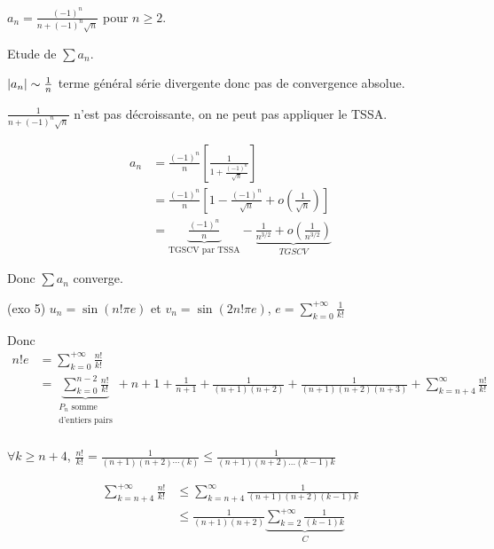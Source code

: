 \begin{exemple}
    $\displaystyle a_n = \frac{(-1)^n}{n + (-1)^n\sqrt{n}}$ pour $n \geqslant 2$. 

    Etude de $\sum a_n$.

    $\left|a_n\right| \sim \frac 1 n $ terme général série divergente donc pas de convergence absolue. 

    $\displaystyle \frac 1 {n + (-1)^n \sqrt n}$ n'est pas décroissante, on ne peut pas appliquer le TSSA. 

    \begin{align*}
        a_n & = \frac{(-1)^n} n \left[ \frac 1 {1 + \frac{(-1)^n} {\sqrt n}} \right] \\
            & = \frac{(-1)^n} n \left[ 1 - \frac{(-1)^n}{\sqrt n} + o\left( \frac 1 {\sqrt n} \right) \right] \\
            & = \underbrace{\frac{(-1)^n} n}_{\text{TGSCV par TSSA}} - \underbrace{\frac 1 {n^{3/2}} + o\left( \frac 1 {n^{3/2}} \right)}_{TGSCV}
    \end{align*}
    
    Donc $\sum a_n$ converge.

    \lvspace (exo 5) $u_n = \sin(n! \pi e)$ et $v_n = \sin(2 n! \pi e)$, $\displaystyle e = \sum_{k = 0 }^{ + \infty } \frac{1}{k!}$

    Donc \begin{align*}
        n! e & = \sum_{k = 0 }^{+ \infty } \frac{n!}{k!} \\
              & = \underbrace{\sum_{k = 0}^{n - 2} \frac{n!}{k!}}_{\substack{P_n \text{ somme} \\ \text{d'entiers pairs}}} + n + 1 + \frac{1}{n + 1} + \frac{1}{(n + 1)(n + 2)} + \frac 1 {(n + 1)(n + 2)(n + 3)} + \sum_{k = n + 4 }^{\infty } \frac{n! }{k!} \\
    \end{align*}

    $\displaystyle \forall k \geqslant n + 4$, $\displaystyle \frac{n!}{k!} = \frac{1}{(n + 1)(n + 2) \cdots (k)} \leqslant \frac{1}{(n + 1)(n + 2)\ldots(k - 1)k}$

    \begin{align*}
        \sum_{k = n + 4 }^{+ \infty } \frac{n! }{k!} & \leqslant \sum_{k = n + 4 }^{\infty    }\frac 1 {(n + 1)(n + 2) (k-1)k} \\
                                                    & \leqslant \frac 1 {(n + 1)(n + 2)} \underbrace{\sum_{k = 2 }^{+ \infty } \frac 1 {(k - 1)k}}_C \\
    \end{align*}


\end{exemple}
